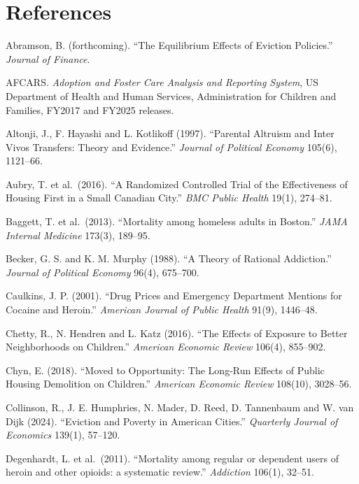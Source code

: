 \documentclass[10pt]{article}
\begin{document}
\section*{References}

{\normalsize
\setlength{\parindent}{0em}
\begin{list}{}{\setlength{\leftmargin}{1.5em}\setlength{\itemindent}{-1.5em}\setlength{\itemsep}{0.35em}\setlength{\parsep}{0em}}
\item Abramson, B. (forthcoming). ``The Equilibrium Effects of Eviction Policies.'' \emph{Journal of Finance}.
\item AFCARS. \emph{Adoption and Foster Care Analysis and Reporting System}, US Department of Health and Human Services, Administration for Children and Families, FY2017 and FY2025 releases.
\item Altonji, J., F. Hayashi and L. Kotlikoff (1997). ``Parental Altruism and Inter Vivos Transfers: Theory and Evidence.'' \emph{Journal of Political Economy} 105(6), 1121--66.
\item Aubry, T. et al.\ (2016). ``A Randomized Controlled Trial of the Effectiveness of Housing First in a Small Canadian City.'' \emph{BMC Public Health} 19(1), 274--81.
\item Baggett, T. et al.\ (2013). ``Mortality among homeless adults in Boston.'' \emph{JAMA Internal Medicine} 173(3), 189--95.
\item Becker, G. S. and K. M. Murphy (1988). ``A Theory of Rational Addiction.'' \emph{Journal of Political Economy} 96(4), 675--700.
\item Caulkins, J. P. (2001). ``Drug Prices and Emergency Department Mentions for Cocaine and Heroin.'' \emph{American Journal of Public Health} 91(9), 1446--48.
\item Chetty, R., N. Hendren and L. Katz (2016). ``The Effects of Exposure to Better Neighborhoods on Children.'' \emph{American Economic Review} 106(4), 855--902.
\item Chyn, E. (2018). ``Moved to Opportunity: The Long-Run Effects of Public Housing Demolition on Children.'' \emph{American Economic Review} 108(10), 3028--56.
\item Collinson, R., J. E. Humphries, N. Mader, D. Reed, D. Tannenbaum and W. van Dijk (2024). ``Eviction and Poverty in American Cities.'' \emph{Quarterly Journal of Economics} 139(1), 57--120.
\item Degenhardt, L. et al.\ (2011). ``Mortality among regular or dependent users of heroin and other opioids: a systematic review.'' \emph{Addiction} 106(1), 32--51.

\end{list}}
\end{document}
